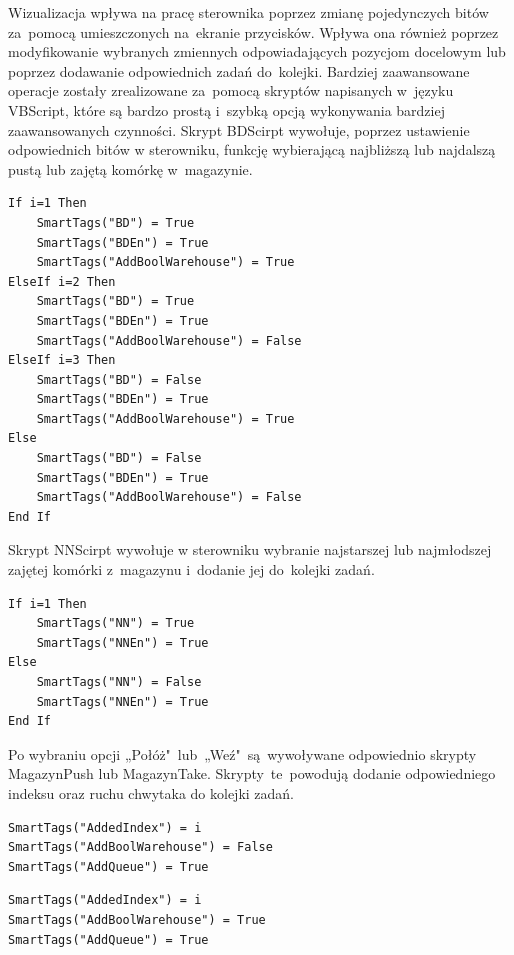 Wizualizacja wpływa na pracę sterownika poprzez zmianę pojedynczych bitów za~pomocą umieszczonych na~ekranie przycisków. Wpływa ona również poprzez modyfikowanie wybranych zmiennych odpowiadających pozycjom docelowym lub poprzez dodawanie odpowiednich zadań do~kolejki. Bardziej zaawansowane operacje zostały zrealizowane za~pomocą skryptów napisanych w~języku VBScript, które są bardzo prostą i~szybką opcją wykonywania bardziej zaawansowanych czynności. 
\newpage
Skrypt BDScirpt wywołuje, poprzez ustawienie odpowiednich bitów w sterowniku, funkcję wybierającą najbliższą lub najdalszą pustą lub zajętą komórkę w~magazynie. \\[1mm]
\begin{lstlisting}[caption={BDScript}]
If i=1 Then
	SmartTags("BD") = True
	SmartTags("BDEn") = True
	SmartTags("AddBoolWarehouse") = True
ElseIf i=2 Then
	SmartTags("BD") = True
	SmartTags("BDEn") = True
	SmartTags("AddBoolWarehouse") = False
ElseIf i=3 Then
	SmartTags("BD") = False
	SmartTags("BDEn") = True
	SmartTags("AddBoolWarehouse") = True
Else
	SmartTags("BD") = False
	SmartTags("BDEn") = True
	SmartTags("AddBoolWarehouse") = False
End If \end{lstlisting}

Skrypt NNScirpt wywołuje w sterowniku wybranie najstarszej lub najmłodszej zajętej komórki z~magazynu i~dodanie jej do~kolejki zadań.\\[1mm]
\begin{lstlisting}[caption={NNScript}]
If i=1 Then 
	SmartTags("NN") = True
	SmartTags("NNEn") = True
Else 
	SmartTags("NN") = False
	SmartTags("NNEn") = True
End If 
\end{lstlisting}

Po wybraniu opcji „Połóż"~lub~„Weź"~są~wywoływane odpowiednio skrypty MagazynPush lub MagazynTake. Skrypty~te~powodują dodanie odpowiedniego indeksu oraz ruchu chwytaka do kolejki zadań. \\[1mm]
\begin{lstlisting}[caption={MagazynPush}]
SmartTags("AddedIndex") = i
SmartTags("AddBoolWarehouse") = False
SmartTags("AddQueue") = True
\end{lstlisting}

\begin{lstlisting}[caption={MagazynTake}]
SmartTags("AddedIndex") = i
SmartTags("AddBoolWarehouse") = True
SmartTags("AddQueue") = True
\end{lstlisting}

